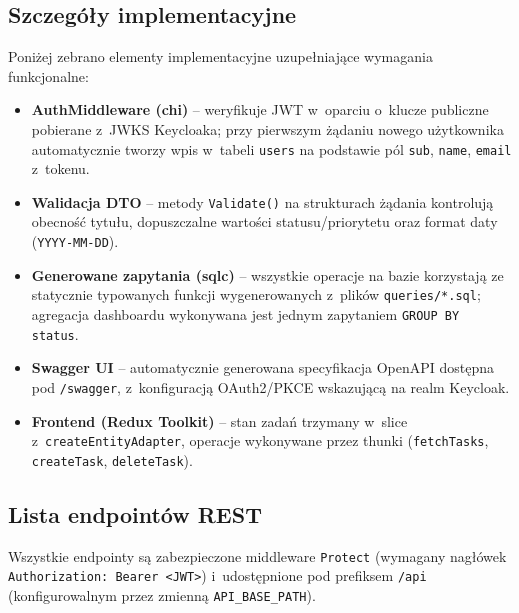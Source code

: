 \documentclass[12pt, a4paper, oneside]{article}
\begin{document}
\subsection{Szczegóły implementacyjne}

Poniżej zebrano elementy implementacyjne uzupełniające wymagania funkcjonalne:
\begin{itemize}
  \item \textbf{AuthMiddleware (chi)} -- weryfikuje JWT w~oparciu o~klucze publiczne pobierane z~JWKS Keycloaka; przy pierwszym żądaniu nowego użytkownika automatycznie tworzy wpis w~tabeli \texttt{users} na podstawie pól \texttt{sub}, \texttt{name}, \texttt{email} z~tokenu.
  \item \textbf{Walidacja DTO} -- metody \texttt{Validate()} na strukturach żądania kontrolują obecność tytułu, dopuszczalne wartości statusu/priorytetu oraz format daty (\texttt{YYYY-MM-DD}).
  \item \textbf{Generowane zapytania (sqlc)} -- wszystkie operacje na bazie korzystają ze statycznie typowanych funkcji wygenerowanych z~plików \texttt{queries/*.sql}; agregacja dashboardu wykonywana jest jednym zapytaniem \texttt{GROUP BY status}.
  \item \textbf{Swagger UI} -- automatycznie generowana specyfikacja OpenAPI dostępna pod \texttt{/swagger}, z~konfiguracją OAuth2/PKCE wskazującą na realm Keycloak.
  \item \textbf{Frontend (Redux Toolkit)} -- stan zadań trzymany w~slice z~\texttt{createEntityAdapter}, operacje wykonywane przez thunki (\texttt{fetchTasks}, \texttt{createTask}, \texttt{deleteTask}).
\end{itemize}

\subsection{Lista endpointów REST}
Wszystkie endpointy są zabezpieczone middleware \texttt{Protect} (wymagany nagłówek \texttt{Authorization: Bearer <JWT>}) i~udostępnione pod prefiksem \texttt{/api} (konfigurowalnym przez zmienną \texttt{API\_BASE\_PATH}).
\end{document}
